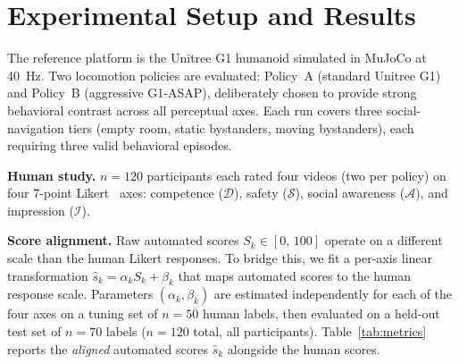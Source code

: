 \documentclass[conference]{IEEEtran}
\begin{document}
\section{Experimental Setup and Results}
The reference platform is the Unitree G1 humanoid simulated in MuJoCo at
\SI{40}{Hz}.
Two locomotion policies are evaluated: {Policy~A} (standard Unitree G1)
and {Policy~B} (aggressive G1-ASAP), deliberately chosen to provide
strong behavioral contrast across all perceptual axes.
Each run covers three social-navigation tiers (empty room, static bystanders,
moving bystanders), each requiring three valid behavioral episodes.

\textbf{Human study.}
$n{=}120$ participants each rated four videos (two per policy) on four
7-point Likert~\cite{article-likert} axes: competence ($\mathcal{D}$), safety ($\mathcal{S}$),
social awareness ($\mathcal{A}$), and impression ($\mathcal{I}$).

\textbf{Score alignment.}
Raw automated scores $S_k \in [0,\,100]$ operate on a different scale than
the human Likert responses.
To bridge this, we fit a per-axis linear transformation
$\hat{s}_k = \alpha_k S_k + \beta_k$
that maps automated scores to the human response scale.
Parameters $(\alpha_k, \beta_k)$ are estimated independently for each of the
four axes on a tuning set of $n{=}50$ human labels, then evaluated on a
held-out test set of $n{=}70$ labels ($n{=}120$ total, all participants).
Table~\ref{tab:metrics} reports the \emph{aligned} automated scores $\hat{s}_k$
alongside the human scores.
\end{document}
